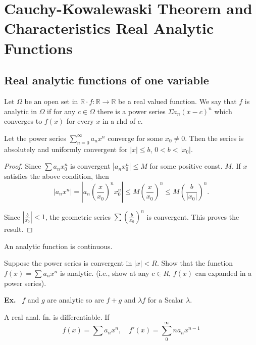 \chapter{Cauchy-Kowalewaski Theorem and Characteristics Real Analytic Functions}\label{chap1}

\section*{Real analytic functions of one variable}\pageoriginale

Let $\Omega$ be an open set in $\mathbb{R}\cdot f : \mathbb{R}\to \mathbb{R}$ be a real valued function. We say that $f$ is analytic in $\Omega$ if for any $c\in \Omega$ there is a power series $\Sigma a_{n}(x-c)^{n}$ which converges to $f(x)$ for every $x$ in a rhd of $c$.

\begin{prop*}
Let the power series $\sum\limits^{\infty}_{n=0}a_{n}x^{n}$ converge for some $x_{0}\neq 0$. Then the series is absolutely and uniformly convergent for $|x|\leq b$, $0<b<|x_{0}|$.
\end{prop*}

\begin{proof}
Since $\sum a_{n}x^{n}_{0}$ is convergent $|a_{n}x^{n}_{0}|\leq M$ for some positive const. $M$. If $x$ satisfies the above condition, then
$$
|a_{n}x^{n}|=\left|a_{n}\left(\frac{x}{x_{0}}\right)^{n}x^{n}_{0}\right|\leq M \left(\frac{x}{x_{0}}\right)^{n}\leq M\left(\frac{b}{|x_{0}|}\right)^{n}.
$$

Since $\left|\frac{b}{x_{0}}\right|<1$, the geometric series $\sum \left(\frac{b}{x_{0}}\right)^{n}$ is convergent. This proves the result.
\end{proof}

\begin{coro*}
An analytic function is continuous.
\end{coro*}

\begin{exer*}
Suppose the power series is convergent in $|x|<R$. Show that the function $f(x)=\sum a_{n}x^{n}$ is analytic. (i.e., show at any $c\in R$, $f(x)$ can expanded in a power series).
\end{exer*}

\noindent
{\bf Ex.}~ $f$ and $g$ are analytic so are $f+g$ and $\lambda f$ for a Scalar $\lambda$.

\begin{prop*}
A real anal. fn. is differentiable. If
$$
f(x)=\sum a_{n}x^{n},\quad f'(x)=\sum\limits^{\infty}_{0}na_{n}x^{n-1}
$$
\end{prop*}

